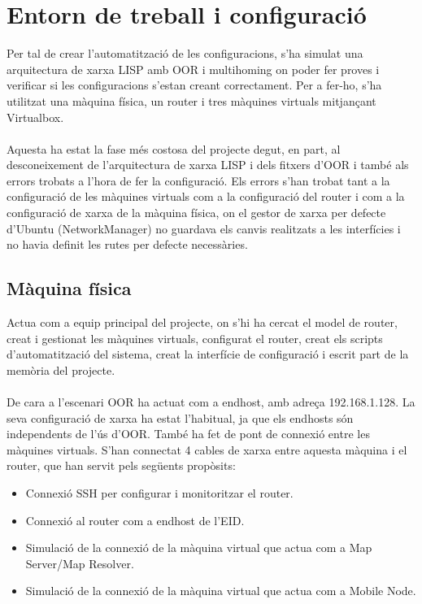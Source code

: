 \documentclass[11pt]{article}
\begin{document}
\section{Entorn de treball i configuració}
Per tal de crear l’automatització de les configuracions, s’ha simulat una arquitectura de xarxa LISP amb OOR i multihoming on poder fer proves i verificar si les configuracions s’estan creant correctament. Per a fer-ho, s’ha utilitzat una màquina física, un router i tres màquines virtuals mitjançant Virtualbox.\\
\\
Aquesta ha estat la fase més costosa del projecte degut, en part, al desconeixement de l’arquitectura de xarxa LISP i dels fitxers d’OOR i també als errors trobats a l’hora de fer la configuració. Els errors s’han trobat tant a la configuració de les màquines virtuals com a la configuració del router i com a la configuració de xarxa de la màquina física, on el gestor de xarxa per defecte d’Ubuntu (NetworkManager) no guardava els canvis realitzats a les interfícies i no havia definit les rutes per defecte necessàries.

\subsection{Màquina física}
Actua com a equip principal del projecte, on s’hi ha cercat el model de router, creat i gestionat les màquines virtuals, configurat el router, creat els scripts d’automatització del sistema, creat la interfície de configuració i escrit part de la memòria del projecte.\\
\\
De cara a l’escenari OOR ha actuat com a endhost, amb adreça 192.168.1.128. La seva configuració de xarxa ha estat l’habitual, ja que els endhosts són independents de l’ús d’OOR.
També ha fet de pont de connexió entre les màquines virtuals. S’han connectat 4 cables de xarxa entre aquesta màquina i el router, que han servit pels següents propòsits:
\begin{itemize}
\item Connexió SSH per configurar i monitoritzar el router.
\item Connexió al router com a endhost de l’EID.
\item Simulació de la connexió de la màquina virtual que actua com a Map Server/Map Resolver.
\item Simulació de la connexió de la màquina virtual que actua com a Mobile Node.
\end{itemize}
\end{document}
